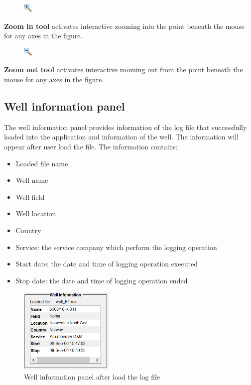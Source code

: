 \documentclass[12pt,a4paper,oneside]{report}
\begin{document}
\begin{figure}
\vspace{-15pt}
\includegraphics[scale=0.9]{tool_zoom_in.png}
\end{figure}
\noindent \textbf{Zoom in tool} activates interactive zooming into the point beneath the mouse for any axes in the figure.

\begin{figure}
\vspace{-15pt}
\includegraphics[scale=0.9]{tool_zoom_out.png}
\end{figure}
\noindent \textbf{Zoom out tool} activates interactive zooming out from the point beneath the mouse for any axes in the figure.

\subsection{Well information panel}
The well information panel provides information of the log file that successfully loaded into the application and information of the well. The information will appear after user load the file. The information contains:
\begin{itemize}
\setlength\itemsep{0.1em}
\item Loaded file name
\item Well name
\item Well field
\item Well location
\item Country
\item Service: the service company which perform the logging operation
\item Start date: the date and time of logging operation executed
\item Stop date: the date and time of logging operation ended
\end{itemize}

\begin{figure}[h]
\centering
\includegraphics[width=0.4\textwidth]{well_info_panel.PNG}
\caption{Well information panel after load the log file}
\label{fig:well_info_panel}
\end{figure}
\end{document}
